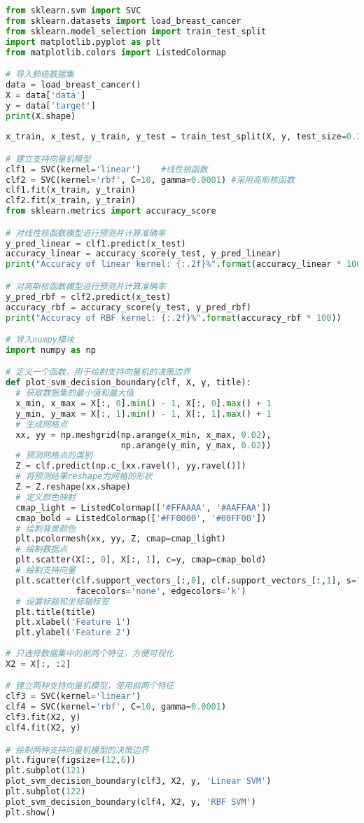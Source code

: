 {\fontsize{10pt}{0.5\baselineskip}\selectfont
	\begin{lstlisting}[caption={实验代码},label={code_appB_lms},language=Python]
from sklearn.svm import SVC
from sklearn.datasets import load_breast_cancer
from sklearn.model_selection import train_test_split
import matplotlib.pyplot as plt
from matplotlib.colors import ListedColormap

# 导入肺癌数据集
data = load_breast_cancer()
X = data['data']
y = data['target']
print(X.shape)
    
x_train, x_test, y_train, y_test = train_test_split(X, y, test_size=0.3)

# 建立支持向量机模型
clf1 = SVC(kernel='linear')    #线性核函数
clf2 = SVC(kernel='rbf', C=10, gamma=0.0001) #采用高斯核函数
clf1.fit(x_train, y_train)
clf2.fit(x_train, y_train)
from sklearn.metrics import accuracy_score

# 对线性核函数模型进行预测并计算准确率
y_pred_linear = clf1.predict(x_test)
accuracy_linear = accuracy_score(y_test, y_pred_linear)
print("Accuracy of linear kernel: {:.2f}%".format(accuracy_linear * 100))

# 对高斯核函数模型进行预测并计算准确率
y_pred_rbf = clf2.predict(x_test)
accuracy_rbf = accuracy_score(y_test, y_pred_rbf)
print("Accuracy of RBF kernel: {:.2f}%".format(accuracy_rbf * 100))

# 导入numpy模块
import numpy as np

# 定义一个函数，用于绘制支持向量机的决策边界
def plot_svm_decision_boundary(clf, X, y, title):
  # 获取数据集的最小值和最大值
  x_min, x_max = X[:, 0].min() - 1, X[:, 0].max() + 1
  y_min, y_max = X[:, 1].min() - 1, X[:, 1].max() + 1
  # 生成网格点
  xx, yy = np.meshgrid(np.arange(x_min, x_max, 0.02),
                       np.arange(y_min, y_max, 0.02))
  # 预测网格点的类别
  Z = clf.predict(np.c_[xx.ravel(), yy.ravel()])
  # 将预测结果reshape为网格的形状
  Z = Z.reshape(xx.shape)
  # 定义颜色映射
  cmap_light = ListedColormap(['#FFAAAA', '#AAFFAA'])
  cmap_bold = ListedColormap(['#FF0000', '#00FF00'])
  # 绘制背景颜色
  plt.pcolormesh(xx, yy, Z, cmap=cmap_light)
  # 绘制数据点
  plt.scatter(X[:, 0], X[:, 1], c=y, cmap=cmap_bold)
  # 绘制支持向量
  plt.scatter(clf.support_vectors_[:,0], clf.support_vectors_[:,1], s=100,
              facecolors='none', edgecolors='k')
  # 设置标题和坐标轴标签
  plt.title(title)
  plt.xlabel('Feature 1')
  plt.ylabel('Feature 2')
  
# 只选择数据集中的前两个特征，方便可视化
X2 = X[:, :2]

# 建立两种支持向量机模型，使用前两个特征
clf3 = SVC(kernel='linear')
clf4 = SVC(kernel='rbf', C=10, gamma=0.0001)
clf3.fit(X2, y)
clf4.fit(X2, y)

# 绘制两种支持向量机模型的决策边界
plt.figure(figsize=(12,6))
plt.subplot(121)
plot_svm_decision_boundary(clf3, X2, y, 'Linear SVM')
plt.subplot(122)
plot_svm_decision_boundary(clf4, X2, y, 'RBF SVM')
plt.show()
	\end{lstlisting}
}

\clearpage{\pagestyle{empty}\cleardoublepage}
